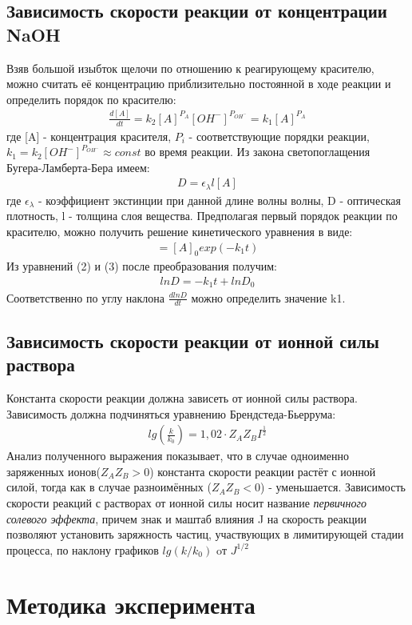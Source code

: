 \documentclass{article}
\begin{document}
\subsection{Зависимость скорости реакции от концентрации NaOH}
 Взяв большой изыбток щелочи по отношению к реагирующему красителю, можно считать её концентрацию приблизительно постоянной в ходе реакции и определить порядок по красителю:
\begin{gather}
    \frac{d[A]}{dt} = k_2 [A]^{P_A}[OH^-]^{P_{OH^-}} = k_1[A]^{P_A}
\end{gather}
где [A] - концентрация красителя, $P_i$ - соответствующие порядки реакции, $k_1 = k_2[OH^-]^{P_{OH^-}} \approx const$ во время реакции. Из закона светопоглащения Бугера-Ламберта-Бера имеем:
\begin{gather}
    D = \epsilon_{\lambda}l[A]
\end{gather}
где $\epsilon_{\lambda}$ - коэффициент экстинции при данной длине волны волны, D - оптическая плотность, l - толщина слоя вещества. Предполагая первый порядок реакции по красителю, можно получить решение кинетического уравнения в виде:
\begin{gather}
    [A] = [A]_0exp(-k_1t)
\end{gather}
Из уравнений (2) и (3) после преобразования получим:
\begin{gather}
    lnD = -k_1t + lnD_0
\end{gather}
Соответственно по углу наклона $\frac{dlnD}{dt}$ можно определить значение k1.
\subsection{Зависимость скорости реакции от ионной силы раствора}
Константа скорости реакции должна зависеть от ионной силы раствора. Зависимость должна подчиняться уравнению Брендстеда-Бьеррума:
\begin{gather}
    lg(\frac{k}{k_0}) = 1,02 \cdot Z_AZ_BI^{\frac{1}{2}}
\end{gather}
Анализ полученного выражения показывает, что в случае одноименно заряженных ионов($Z_AZ_B > 0$) константа скорости реакции растёт с ионной силой, тогда как в случае разноимённых ($Z_AZ_B < 0$) - уменьшается. Зависимость скорости реакций с растворах от ионной силы носит название \textit{первичного солевого эффекта}, причем знак и маштаб влияния J на скорость реакции позволяют установить заряжность частиц, участвующих в лимитирующей стадии процесса, по наклону графиков $lg(k/k_0)$ oт $J^{1/2}$


\section{Методика эксперимента}
\end{document}

